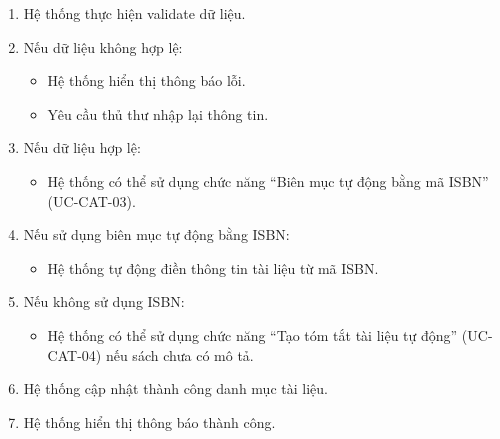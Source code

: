 \begin{enumerate}
\begin{itemize}
        \item Hệ thống kiểm tra tài liệu có đang được mượn hay không.
        
        \item Nếu tài liệu đang được mượn:
        \begin{itemize}
            \item Hệ thống hiển thị thông báo lỗi:
            
            ``Không thể xóa vì sách đang được mượn''.
        \end{itemize}
        
        \item Nếu tài liệu không đang được mượn:
        \begin{itemize}
            \item Hệ thống thực hiện xóa mềm (Soft Delete).
        \end{itemize}
    \end{itemize}

    \item Hệ thống thực hiện validate dữ liệu.

    \item Nếu dữ liệu không hợp lệ:
    \begin{itemize}
        \item Hệ thống hiển thị thông báo lỗi.
        
        \item Yêu cầu thủ thư nhập lại thông tin.
    \end{itemize}

    \item Nếu dữ liệu hợp lệ:
    \begin{itemize}
        \item Hệ thống có thể sử dụng chức năng ``Biên mục tự động bằng mã ISBN'' (UC-CAT-03).
    \end{itemize}

    \item Nếu sử dụng biên mục tự động bằng ISBN:
    \begin{itemize}
        \item Hệ thống tự động điền thông tin tài liệu từ mã ISBN.
    \end{itemize}

    \item Nếu không sử dụng ISBN:
    \begin{itemize}
        \item Hệ thống có thể sử dụng chức năng ``Tạo tóm tắt tài liệu tự động'' (UC-CAT-04) nếu sách chưa có mô tả.
    \end{itemize}

    \item Hệ thống cập nhật thành công danh mục tài liệu.

    \item Hệ thống hiển thị thông báo thành công.
\end{enumerate}

